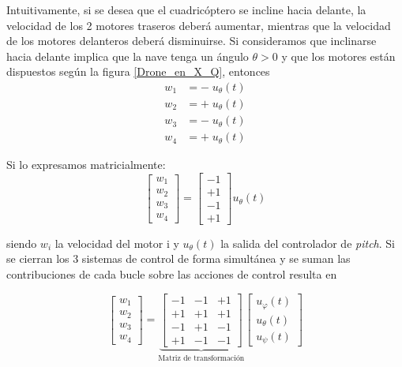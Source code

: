 Intuitivamente, si se desea que el cuadricóptero se incline hacia delante, la velocidad de los 2 motores traseros deberá aumentar, mientras que la velocidad de los motores delanteros deberá disminuirse. Si consideramos que inclinarse hacia delante implica que la nave tenga un ángulo $\theta > 0$ y que los motores están dispuestos según la figura \ref{Drone_en_X_Q}, entonces 
\begin{align*}
	w_1 &= -\; u_\theta(t)\\
	w_2 &= +\; u_\theta(t)\\
	w_3 &= -\; u_\theta(t)\\
	w_4 &= +\; u_\theta(t)
\end{align*}

Si lo expresamos matricialmente:
\begin{equation}
	\left[\begin{array}{c}
		w_1\\
	w_2\\
	w_3\\
	w_4
	\end{array}\right] =\left[\begin{array}{c}
	-1 \\
	 +1 \\
	  -1 \\
	   +1
	\end{array}\right] u_\theta(t) 
\end{equation}

siendo $w_i$ la velocidad del motor i y $u_\theta(t)$ la salida del controlador de \textit{pitch}. Si se cierran los 3 sistemas de control de forma simultánea y se suman las contribuciones de cada bucle sobre las acciones de control resulta en


\begin{equation}
\left[\begin{array}{c}
w_1\\
w_2\\
w_3\\
w_4
\end{array}\right] =\underbrace{\left[\begin{array}{ccc}
-1 & -1 & +1 \\
+1 & +1 & +1 \\
-1 & +1 & -1 \\
+1 & -1 & -1
\end{array}\right]}_{\text{Matriz de transformación}}
\left[\begin{array}{c}
u_\varphi(t)\\
u_\theta(t)\\
u_\psi(t)
\end{array}\right] 
\end{equation}

